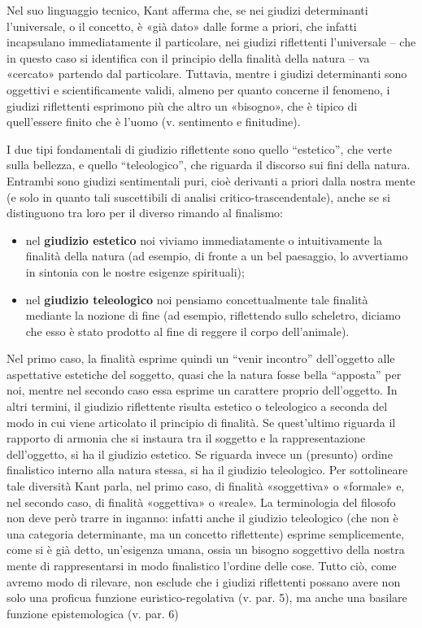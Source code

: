 \documentclass[a4paper, twoside, titlepage]{book}
\begin{document}
Nel suo linguaggio tecnico, Kant afferma che, se nei giudizi determinanti l’universale, o il concetto, è «già dato» dalle forme a priori, che infatti incapsulano immediatamente il particolare, nei giudizi riflettenti l’universale – che in questo caso si identifica con il principio della finalità della natura – va «cercato» partendo dal particolare. Tuttavia, mentre i giudizi determinanti sono oggettivi e scientificamente validi, almeno per quanto concerne il fenomeno, i giudizi riflettenti esprimono più che altro un «bisogno», che è tipico di quell’essere finito che è l’uomo (v. sentimento e finitudine).

I due tipi fondamentali di giudizio riflettente sono quello “estetico”, che verte sulla bellezza, e quello “teleologico”, che riguarda il discorso sui fini della natura. Entrambi sono giudizi sentimentali puri, cioè derivanti a priori dalla nostra mente (e solo in quanto tali suscettibili di analisi critico-trascendentale), anche se si distinguono tra loro per il diverso rimando al finalismo:
\begin{itemize}
\item nel \textbf{giudizio estetico} noi viviamo immediatamente o intuitivamente la finalità della natura (ad esempio, di fronte a un bel paesaggio, lo avvertiamo in sintonia con le nostre esigenze spirituali);
\item nel \textbf{giudizio teleologico} noi pensiamo concettualmente tale finalità mediante la nozione di fine (ad esempio, riflettendo sullo scheletro, diciamo che esso è stato prodotto al fine di reggere il corpo dell’animale).
\end{itemize}

Nel primo caso, la finalità esprime quindi un “venir incontro” dell’oggetto alle aspettative estetiche del soggetto, quasi che la natura fosse bella “apposta” per noi, mentre nel secondo caso essa esprime un carattere proprio dell’oggetto. In altri termini, il giudizio riflettente risulta estetico o teleologico a seconda del modo in cui viene articolato il principio di finalità.
Se quest’ultimo riguarda il rapporto di armonia che si instaura tra il soggetto e la rappresentazione dell’oggetto, si ha il giudizio estetico. Se riguarda invece un (presunto) ordine finalistico interno alla natura stessa, si ha il giudizio teleologico. Per sottolineare tale diversità Kant parla, nel primo caso, di finalità «soggettiva» o «formale» e, nel secondo caso, di finalità «oggettiva» o «reale». La terminologia del filosofo non deve però trarre in inganno: infatti anche il giudizio teleologico (che non è una categoria determinante, ma un concetto riflettente) esprime semplicemente, come si è già detto, un’esigenza umana, ossia un bisogno soggettivo della nostra mente di rappresentarsi in modo finalistico l’ordine delle cose. Tutto ciò, come avremo modo di rilevare, non esclude che i giudizi riflettenti possano avere non solo una proficua funzione euristico-regolativa (v. par. 5), ma anche una basilare funzione epistemologica (v. par. 6)
\end{document}
